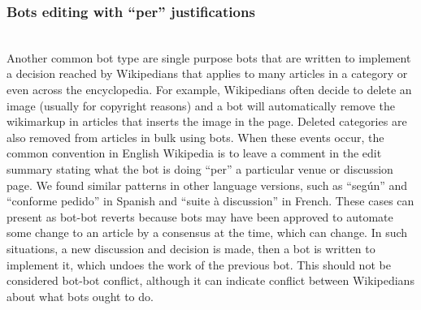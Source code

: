 \documentclass[format=acmsmall, review=false, screen=true]{acmart}%
\begin{document}
\subsubsection{Bots editing with ``per'' justifications}  
~\\
Another common bot type are single purpose bots that are written to implement a decision reached by Wikipedians that applies to many articles in a category or even across the encyclopedia. For example, Wikipedians often decide to delete an image (usually for copyright reasons) and a bot will automatically remove the wikimarkup in articles that inserts the image in the page. Deleted categories are also removed from articles in bulk using bots. When these events occur, the common convention in English Wikipedia is to leave a comment in the edit summary stating what the bot is doing ``per'' a particular venue or discussion page. We found similar patterns in other language versions, such as ``según'' and ``conforme pedido'' in Spanish and ``suite à discussion'' in French. These cases can present as bot-bot reverts because bots may have been approved to automate some change to an article by a consensus at the time, which can change. In such situations, a new discussion and decision is made, then a bot is written to implement it, which undoes the work of the previous bot. This should not be considered bot-bot conflict, although it can indicate conflict between Wikipedians about what bots ought to do.
\end{document}
